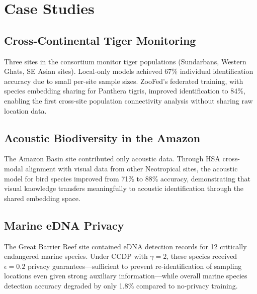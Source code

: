 \section{Case Studies}

\label{sec:case_studies}

\subsection{Cross-Continental Tiger Monitoring}

Three sites in the consortium monitor tiger populations (Sundarbans, Western Ghats, SE Asian sites).
Local-only models achieved 67\% individual identification accuracy due to small per-site sample sizes.
ZooFed's federated training, with species embedding sharing for Panthera tigris, improved identification to 84\%, enabling the first cross-site population connectivity analysis without sharing raw location data.

\subsection{Acoustic Biodiversity in the Amazon}

The Amazon Basin site contributed only acoustic data.
Through HSA cross-modal alignment with visual data from other Neotropical sites, the acoustic model for bird species improved from 71\% to 88\% accuracy, demonstrating that visual knowledge transfers meaningfully to acoustic identification through the shared embedding space.

\subsection{Marine eDNA Privacy}

The Great Barrier Reef site contained eDNA detection records for 12 critically endangered marine species.
Under CCDP with $\gamma=2$, these species received $\epsilon=0.2$ privacy guarantees---sufficient to prevent re-identification of sampling locations even given strong auxiliary information---while overall marine species detection accuracy degraded by only 1.8\% compared to no-privacy training.

